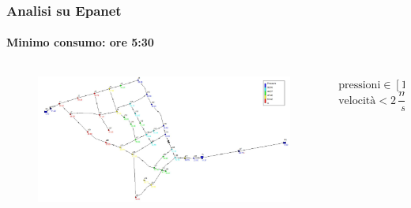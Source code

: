 \documentclass{beamer}
\begin{document}
%
\begin{frame}
	\frametitle{Analisi su Epanet}
	\framesubtitle{Minimo consumo: ore 5:30}
	\begin{columns}
		\begin{column}{.7\textwidth}
				\begin{figure}
					\centering
					\includegraphics[width=\linewidth]{images/pressure_min_demand}
				\end{figure}
		\end{column}
%
		\begin{column}{.3\textwidth}
                $\text{pressioni} \in [15, 70]\,m$
                $\text{velocit\`a} < 2\,\dfrac{m}{s}$
		\end{column}
	\end{columns}
\end{frame}
%
%
%
\end{document}
